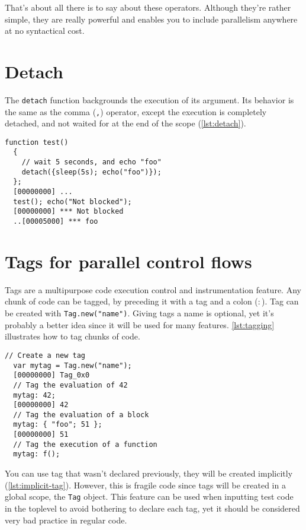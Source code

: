 \documentclass[openright,twoside,12pt]{report}
\begin{document}
That's about all there is to say about these operators. Although
they're rather simple, they are really powerful and enables you to
include parallelism anywhere at no syntactical cost.

\section{Detach}

The \texttt{detach} function backgrounds the execution of its
argument. Its behavior is the same as the comma (\texttt{,}) operator,
except the execution is completely detached, and not waited for at the
end of the scope (\autoref{lst:detach}).

\begin{lstlisting}[caption=Detach, label=lst:detach]
  function test()
  {
    // wait 5 seconds, and echo "foo"
    detach({sleep(5s); echo("foo")});
  };
  [00000000] ...
  test(); echo("Not blocked");
  [00000000] *** Not blocked
  ..[00005000] *** foo
\end{lstlisting}

\section{Tags for parallel control flows}

Tags are a multipurpose code execution control and instrumentation
feature. Any chunk of code can be tagged, by preceding it with a tag
and a colon (\texttt{$:$}). Tag can be created with
\lstinline|Tag.new("name")|. Giving tags a name is optional, yet it's
probably a better idea since it will be used for many
features. \autoref{lst:tagging} illustrates how to tag chunks of code.

\begin{lstlisting}[caption=Tagging a block of code, label=lst:tagging]
  // Create a new tag
  var mytag = Tag.new("name");
  [00000000] Tag_0x0
  // Tag the evaluation of 42
  mytag: 42;
  [00000000] 42
  // Tag the evaluation of a block
  mytag: { "foo"; 51 };
  [00000000] 51
  // Tag the execution of a function
  mytag: f();
\end{lstlisting}

You can use tag that wasn't declared previously, they will be created
implicitly (\autoref{lst:implicit-tag}). However, this is fragile code since
tags will be created in a global scope, the \texttt{Tag} object. This
feature can be used when inputting test code in the toplevel to avoid
bothering to declare each tag, yet it should be considered very bad
practice in regular code.
\end{document}
